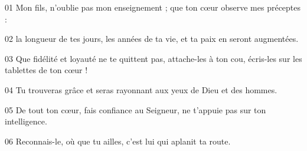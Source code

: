 01 Mon fils, n’oublie pas mon enseignement ; que ton cœur observe mes préceptes :

02 la longueur de tes jours, les années de ta vie, et ta paix en seront augmentées.

03 Que fidélité et loyauté ne te quittent pas, attache-les à ton cou, écris-les sur les tablettes de ton cœur !

04 Tu trouveras grâce et seras rayonnant aux yeux de Dieu et des hommes.

05 De tout ton cœur, fais confiance au Seigneur, ne t’appuie pas sur ton intelligence.

06 Reconnais-le, où que tu ailles, c’est lui qui aplanit ta route.
